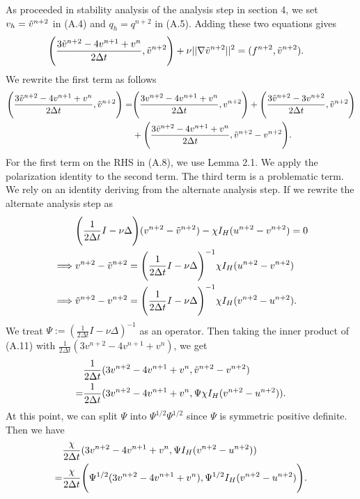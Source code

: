 \documentclass[11pt,a4paper]{article}
\begin{document}
As proceeded in stability analysis of the analysis step in section 4, we set $v_h=\Tilde{v}^{n+2}$ in (A.4) and $q_h=q^{n+2}$ in (A.5). Adding these two equations gives
\begin{align}
    &\Bigg(\frac{3\Tilde{v}^{n+2}-4v^{n+1}+v^n}{2\Delta t}, \Tilde{v}^{n+2}\Bigg) + \nu ||\nabla \Tilde{v}^{n+2}||^2 =(f^{n+2},\Tilde{v}^{n+2}).
\end{align}
We rewrite the first term as follows
\begin{align}
    \Bigg(\frac{3\Tilde{v}^{n+2}-4v^{n+1}+v^n}{2\Delta t}, \Tilde{v}^{n+2}\Bigg)=
    &\Bigg(\frac{3v^{n+2}-4v^{n+1}+v^n}{2\Delta t}, v^{n+2}\Bigg) + \Bigg(\frac{3\Tilde{v}^{n+2}-3v^{n+2}}{2\Delta t}, \Tilde{v}^{n+2}\Bigg) \notag \\
    &+\Bigg(\frac{3\Tilde{v}^{n+2}-4v^{n+1}+v^n}{2\Delta t}, \Tilde{v}^{n+2}-v^{n+2}\Bigg).
\end{align}
For the first term on the RHS in (A.8), we use Lemma 2.1. We apply the polarization identity to the second term. The third term is a problematic term. We rely on an identity deriving from the alternate analysis step.
If we rewrite the alternate analysis step as
\begin{align}
    &\Bigg(\frac{1}{2\Delta t}I-\nu \Delta\Bigg)(v^{n+2}-\Tilde{v}^{n+2})-\chi I_H(u^{n+2}-v^{n+2})=0 \\
    \implies& v^{n+2}-\tilde{v}^{n+2} = \Bigg(\frac{1}{2\Delta t}I-\nu \Delta\Bigg)^{-1}\chi I_H(u^{n+2}-v^{n+2}) \\
    \implies& \tilde{v}^{n+2}-v^{n+2} = \Bigg(\frac{1}{2\Delta t}I-\nu \Delta\Bigg)^{-1}\chi I_H(v^{n+2}-u^{n+2}).
\end{align}
We treat $\Psi:=(\frac{1}{2\Delta t}I-\nu \Delta)^{-1}$ as an operator. Then taking the inner product of (A.11) with $\frac{1}{2\Delta t}(3v^{n+2}-4v^{n+1}+v^n)$, we get
\begin{align}
    &\frac{1}{2\Delta t}(3v^{n+2}-4v^{n+1}+v^n, \tilde{v}^{n+2}-v^{n+2}) \notag \\ 
    =&\frac{1}{2\Delta t} (3v^{n+2}-4v^{n+1}+v^n, \Psi \chi I_H(v^{n+2}-u^{n+2})).
\end{align}
At this point, we can split $\Psi$ into $\Psi^{1/2}\Psi^{1/2}$ since $\Psi$ is symmetric positive definite. Then we have
\begin{align}
    &\frac{\chi}{2\Delta t}(3v^{n+2}-4v^{n+1}+v^n, \Psi I_H(v^{n+2}-u^{n+2})) \notag \\
    =&\frac{\chi}{2\Delta t}\Bigg(\Psi^{1/2}(3v^{n+2}-4v^{n+1}+v^n), \Psi^{1/2} I_H(v^{n+2}-u^{n+2})\Bigg).
\end{align}
\end{document}
